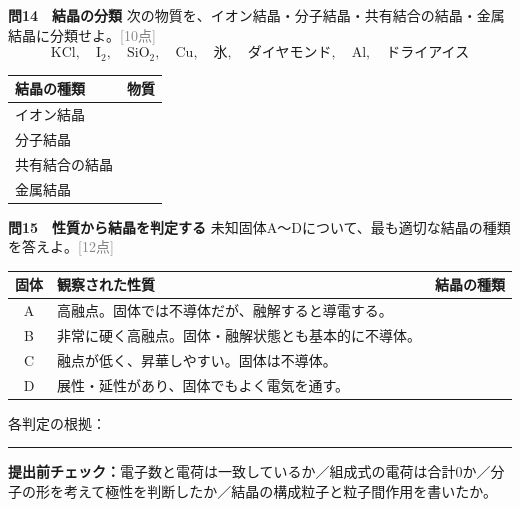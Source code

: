 \documentclass[11pt,a4paper]{ctexart}
\newcommand{\blank}[1]{\rule{#1}{0.4pt}}
\newcommand{\score}[1]{\hfill\textcolor{gray}{[#1点]}}
\newcommand{\ansspace}[1]{\par\vspace{#1}}
\newenvironment{qbox}{\begin{list}{}{\setlength{\leftmargin}{0pt}}\item\begin{minipage}{\linewidth}}{\end{minipage}\end{list}\vspace{3mm}}
\newif\ifshowanswers
\begin{document}
\begin{qbox}
\textbf{問14　結晶の分類}
\quad 次の物質を、イオン結晶・分子結晶・共有結合の結晶・金属結晶に分類せよ。\score{10}
\[
\mathrm{KCl},\quad \mathrm{I_2},\quad \mathrm{SiO_2},\quad \mathrm{Cu},\quad
\text{氷},\quad \text{ダイヤモンド},\quad \mathrm{Al},\quad \text{ドライアイス}
\]
\begin{center}
\renewcommand{\arraystretch}{1.7}
\begin{tabularx}{\linewidth}{l|X}
\toprule
結晶の種類 & 物質\\ \midrule
イオン結晶 &\\
分子結晶 &\\
共有結合の結晶 &\\
金属結晶 &\\
\bottomrule
\end{tabularx}
\end{center}
\end{qbox}

\begin{qbox}
\textbf{問15　性質から結晶を判定する}
\quad 未知固体A～Dについて、最も適切な結晶の種類を答えよ。\score{12}
\begin{center}
\small
\begin{tabularx}{\linewidth}{c|X|X}
\toprule
固体 & 観察された性質 & 結晶の種類\\ \midrule
A & 高融点。固体では不導体だが、融解すると導電する。 &\\
B & 非常に硬く高融点。固体・融解状態とも基本的に不導体。 &\\
C & 融点が低く、昇華しやすい。固体は不導体。 &\\
D & 展性・延性があり、固体でもよく電気を通す。 &\\
\bottomrule
\end{tabularx}
\end{center}
各判定の根拠：\blank{125mm}\ansspace{9mm}
\end{qbox}

\begin{center}
\colorbox{SoftRed}{\parbox{.9\linewidth}{
\textbf{提出前チェック：}電子数と電荷は一致しているか／組成式の電荷は合計0か／分子の形を考えて極性を判断したか／結晶の構成粒子と粒子間作用を書いたか。
}}
\end{center}

\ifshowanswers
\clearpage
\end{document}
